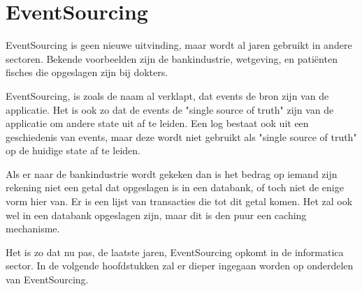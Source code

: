 
\chapter{EventSourcing}
\label{ch:eventsourcing}

EventSourcing is geen nieuwe uitvinding, maar wordt al jaren gebruikt in andere sectoren. Bekende voorbeelden zijn de bankindustrie, wetgeving, en patiënten fisches die opgeslagen zijn bij dokters.

EventSourcing, is zoals de naam al verklapt, dat events de bron zijn van de applicatie. Het is ook zo dat de events de "single source of truth" zijn van de applicatie om andere state uit af te leiden. Een log bestaat ook uit een geschiedenis van events, maar deze wordt niet gebruikt als "single source of truth" op de huidige state af te leiden.

Als er naar de bankindustrie wordt gekeken dan is het bedrag op iemand zijn rekening niet een getal dat opgeslagen is in een databank, of toch niet de enige vorm hier van. Er is een lijst van transacties die tot dit getal komen. Het zal ook wel in een databank opgeslagen zijn, maar dit is den puur een caching mechanisme.

Het is zo dat nu pas, de laatste jaren, EventSourcing opkomt in de informatica sector. In de volgende hoofdstukken zal er dieper ingegaan worden op onderdelen van EventSourcing.